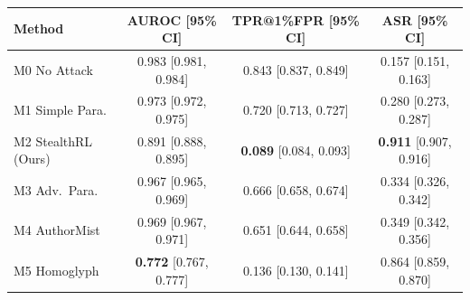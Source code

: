 \begin{tabular}{lccc}
\toprule
Method & AUROC [95\% CI] & TPR@1\%FPR [95\% CI] & ASR [95\% CI] \\
\midrule
M0 No Attack & 0.983 [0.981, 0.984] & 0.843 [0.837, 0.849] & 0.157 [0.151, 0.163] \\
M1 Simple Para. & 0.973 [0.972, 0.975] & 0.720 [0.713, 0.727] & 0.280 [0.273, 0.287] \\
M2 StealthRL (Ours) & 0.891 [0.888, 0.895] & \textbf{0.089} [0.084, 0.093] & \textbf{0.911} [0.907, 0.916] \\
M3 Adv.\ Para. & 0.967 [0.965, 0.969] & 0.666 [0.658, 0.674] & 0.334 [0.326, 0.342] \\
M4 AuthorMist & 0.969 [0.967, 0.971] & 0.651 [0.644, 0.658] & 0.349 [0.342, 0.356] \\
M5 Homoglyph & \textbf{0.772} [0.767, 0.777] & 0.136 [0.130, 0.141] & 0.864 [0.859, 0.870] \\
\bottomrule
\end{tabular}
